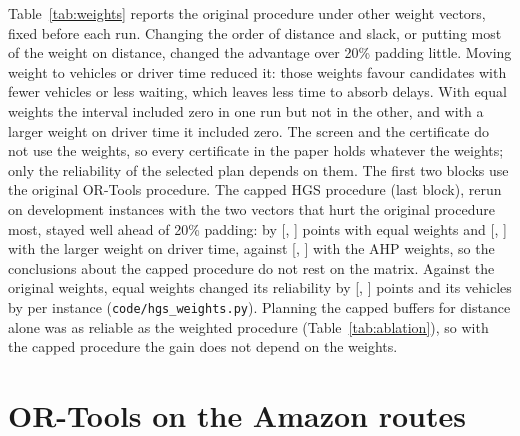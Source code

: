 \documentclass[11pt,a4paper]{article}
\theoremstyle{remark}
\begin{document}
\begin{center}
\small

\end{center}

Table~\ref{tab:weights} reports the original procedure under other weight vectors,
fixed before each run. Changing the order of distance and slack, or putting most of
the weight on distance, changed the advantage over 20\% padding little. Moving
weight to vehicles or driver time reduced it: those weights favour candidates with
fewer vehicles or less waiting, which leaves less time to absorb delays. With equal
weights the interval included zero in one run but not in the other, and with a
larger weight on driver time it included zero. The screen and
the certificate do not use the weights, so every certificate in the paper holds
whatever the weights; only the reliability of the selected plan depends on them.
The first two blocks use the original OR-Tools procedure. The capped HGS procedure
(last block), rerun on \HwEqN{} development instances with the two vectors that hurt
the original procedure most, stayed well ahead of 20\% padding: by \HwEqPad{}
[\HwEqPadLo, \HwEqPadHi] points with equal weights and \HwDurPad{} [\HwDurPadLo,
\HwDurPadHi] with the larger weight on driver time, against \HwEqOrigPad{}
[\HwEqOrigPadLo, \HwEqOrigPadHi] with the AHP weights, so the conclusions about the
capped procedure do not rest on the matrix. Against the original weights, equal weights changed its reliability by \HwEqOrig{}
[\HwEqOrigLo, \HwEqOrigHi] points and its vehicles by \HwEqFleet{} per instance
(\texttt{code/hgs\_weights.py}). Planning
the capped buffers for distance alone was as reliable as the weighted procedure
(Table~\ref{tab:ablation}), so with the capped procedure the gain does not depend on
the weights.



\section{OR-Tools on the Amazon routes}\label{app:amazon-ortools}
\setcounter{table}{0}
\end{document}
